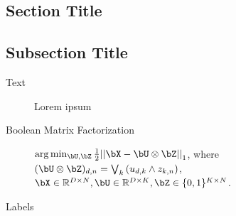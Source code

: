 \documentclass[a4paper,11pt]{article}
\newcommand{\verbose}[1]{\iftoggle{verbose}{\color{gray}#1}{}}
\newcommand{\R}[0]{\mathbb{R}}
\newcommand{\norm}[1]{{\vert|#1\vert|}}
\newcommand{\seeslides}[1][]{%
	\verbose{%
		\colorbox{Cerulean!50}{%
			\textcolor{black}{%
				See slides%
				\ifthenelse{\isempty{#1}}{}{: #1}%
			}%
		}%
	}%
}
\newcommand{\seeexercise}[1][]{%
	\verbose{%
		\colorbox{Cerulean!50}{%
			\textcolor{black}{%
				See exercise%
				\ifthenelse{\isempty{#1}}{}{: #1}%
			}%
		}%
	}%
}
\newcommand{\seeliterature}[1][]{%
	\verbose{%
		\colorbox{Cerulean!50}{%
			\textcolor{black}{%
				See literature%
				\ifthenelse{\isempty{#1}}{}{: #1}%
			}%
		}%
	}%
}
\newcommand{\unclear}[1][]{%
	\verbose{%
		\colorbox{Red!50}{%
			\textcolor{black}{%
				Unclear%
				\ifthenelse{\isempty{#1}}{}{: #1}%
			}%
		}%
	}%
}
\begin{document}
\begin{multicols}{3}

\section{Section Title}

\subsection{Subsection Title}

\begin{description}
	\item[Text]
		Lorem ipsum
	\verbose{%
	\item[Text In Verbose Summary]
		Lorem Ipsum
	}
	\item[Boolean Matrix Factorization]
		$\arg \min_{\bU,\bZ} \frac{1}{2} \norm{\bX-\bU\otimes \bZ}_1$, where
		$(\bU\otimes \bZ)_{d,n} = \bigvee_k \left(u_{d,k} \wedge z_{k,n}\right)$,
		$\bX\in \R^{D\times N}, \bU\in \R^{D\times K}, \bZ\in \{0,1\}^{K\times N}$.
	\item[Labels]
		\unclear

		\unclear[Proof]

		\seeslides

		\seeliterature

		\seeexercise
\end{description}

\raggedcolumns

\end{multicols}
\end{document}
